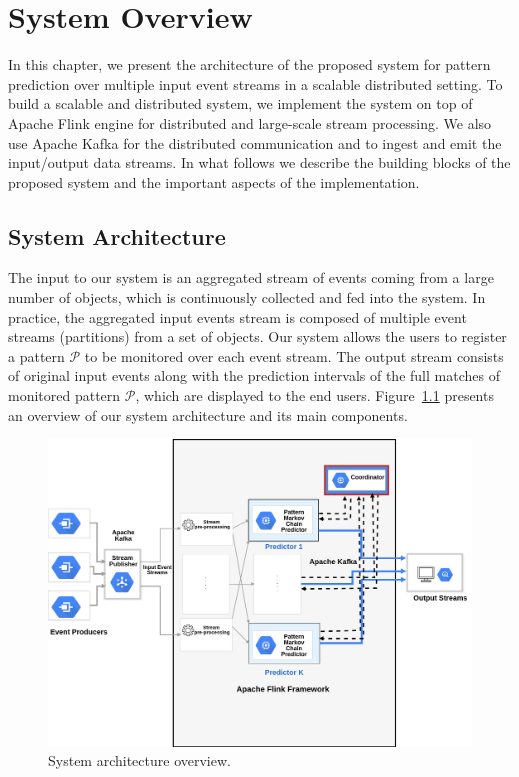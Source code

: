 

\chapter{System Overview}
\label{chapter:overview}


\par In this chapter, we present the architecture of the proposed system for pattern prediction over multiple input event streams in a scalable distributed setting. To build a scalable and distributed system, we implement the system on top of Apache Flink engine for distributed and large-scale stream processing. We also use Apache Kafka for the distributed communication and to ingest and emit the input/output data streams. In what follows we describe the building blocks of the proposed system and the important aspects of the implementation.

\section{System Architecture}
\label{sec:architecture}
The input to our system is an aggregated stream of events coming from a large number of  objects, which is continuously collected and fed into the system. In practice, the aggregated input events stream is composed of multiple event streams (partitions) from a set of objects. Our system allows the users to register a pattern $\mathcal{P}$ to be monitored over each event stream. The output stream consists of original input events along with  the prediction intervals of the full matches of monitored pattern $\mathcal{P}$, which are displayed to the end users. Figure~\ref{fig:architecture} presents an overview of our system architecture and its main components.      


\begin{figure}[h]
	\centering
	\includegraphics[width=\linewidth]{chapters/figures/system_v2.png}
	
	\caption{System architecture overview.}
	\label{fig:architecture}
\end{figure}

